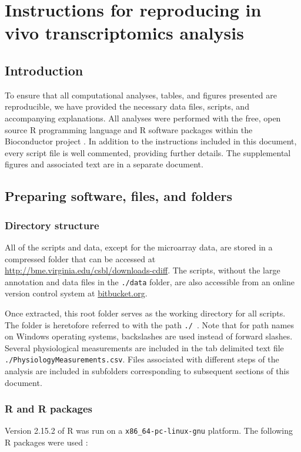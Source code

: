 \chapter[Reproducing in vivo analyses]{Instructions for reproducing in vivo transcriptomics analysis}

\section{Introduction}\label{S:Intro}
To ensure that all computational analyses, tables, and figures
presented are reproducible, we have provided the necessary data
files, scripts, and accompanying explanations. All analyses 
were performed with the free, open source R programming language
and R software packages within the Bioconductor project \cite{Gentleman:2004tt}. 
In addition
to the instructions included in this document, every script file
is well commented, providing further details. The supplemental figures
and associated text are in a separate document. 

\section{Preparing software, files, and folders}\label{S:Files} 

\subsection{Directory structure}
All of the scripts and data, except for the microarray data, are stored 
in a compressed folder that can be accessed at
\url{http://bme.virginia.edu/csbl/downloads-cdiff}. The scripts,
without the large annotation and data files in the \texttt{./data} folder, 
are also accessible from an online version control system at 
\href{https://bitbucket.org/kdauria/cdiff}{bitbucket.org}.

Once extracted, this root folder serves as the working 
directory for all scripts. The folder is heretofore
referred to with the path \texttt{./}~. Note that for path
names on Windows operating systems, backslashes are used instead of
forward slashes. Several physiological measurements are
included in the tab delimited text file
\texttt{./PhysiologyMeasurements.csv}. Files associated with 
different steps of the analysis are included
in subfolders corresponding to subsequent sections of this document.

\subsection{R and R packages}
Version 2.15.2 of R was run on a \texttt{x86\_{}64-pc-linux-gnu} platform. 
The following R packages were 
used \cite{Gautier:2004kv,Bolstad:2003ia,Durinck:2009ki,Wickham:2009ft,Smyth:2005ht,Wickham:2007tu} :


